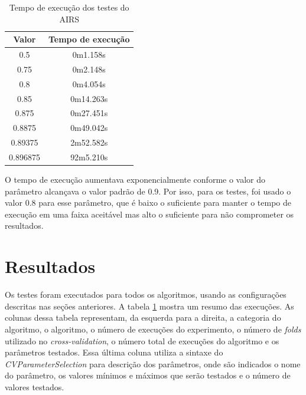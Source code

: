 \vspace{0.5cm}
\begin{table}[h]
    \scriptsize
    \centering
    \caption{Tempo de execução dos testes do AIRS}
    \label{tbl:dev_exec_summary}
    \vspace{0.5cm}
    \begin{tabular}{c c}
        \textbf{Valor} & \textbf{Tempo de execução} \\
        \hline
        0.5            &  0m1.158s  \\
        0.75           &  0m2.148s  \\
        0.8            &  0m4.054s  \\
        0.85           &  0m14.263s \\
        0.875          &  0m27.451s \\
        0.8875         &  0m49.042s \\
        0.89375        &  2m52.582s \\
        0.896875       &  92m5.210s \\
    \end{tabular}
\end{table}
\vspace{0.5cm}

O tempo de execução aumentava exponencialmente conforme o valor do parâmetro alcançava o valor padrão de 0.9. Por isso, para os testes, foi usado o valor 0.8 para esse parâmetro, que é baixo o suficiente para manter o tempo de execução em uma faixa aceitável mas alto o suficiente para não comprometer os resultados.

\section{Resultados}

Os testes foram executados para todos os algoritmos, usando as configurações descritas nas seções anteriores. A tabela \ref{tbl:dev_exec_summary} mostra um resumo das execuções. As colunas dessa tabela representam, da esquerda para a direita, a categoria do algoritmo, o algoritmo, o número de execuções do experimento, o número de \emph{folds} utilizado no \emph{cross-validation}, o número total de execuções do algoritmo e os parâmetros testados. Essa última coluna utiliza a sintaxe do \emph{CVParameterSelection} para descrição dos parâmetros, onde são indicados o nome do parâmetro, os valores mínimos e máximos que serão testados e o número de valores testados.

